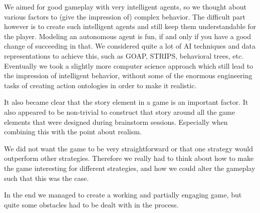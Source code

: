 \documentclass[11pt,a4paper]{article}
\begin{document}
We aimed for good gameplay with very intelligent agents, so we thought about various factors to (give the impression of) complex behavior. The difficult part however is to create such intelligent agents and still keep them understandable for the player. Modeling an autonomous agent is fun, if and only if you have a good change of succeeding in that. We considered quite a lot of AI techniques and data representations to achieve this, such as GOAP, STRIPS, behavioral trees, etc. Eventually we took a slightly more computer science approach which still lead to the impression of intelligent behavior, without some of the enormous engineering tasks of creating action ontologies in order to make it realistic.

It also became clear that the story element in a game is an important factor. It also appeared to be non-trivial to construct that story around all the game elements that were designed during brainstorm sessions. Especially when combining this with the point about realism.

We did not want the game to be very straightforward or that one strategy would outperform other strategies. Therefore we really had to think about how to make the game interesting for different strategies, and how we could alter the gameplay such that this was the case.

In the end we managed to create a working and partially engaging game, but quite some obstacles had to be dealt with in the process.
\end{document}
